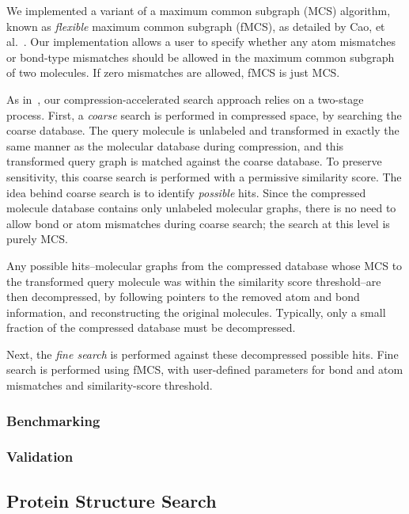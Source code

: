 \documentclass[review,preprint,12pt]{elsarticle}
\theoremstyle{definition}
\theoremstyle{remark}
\numberwithin{equation}{section}
\begin{document}
We implemented a variant of a maximum common subgraph (MCS) algorithm, known as \emph{flexible} maximum
common subgraph (fMCS), as detailed by Cao, et al.~\cite{cao}.
Our implementation allows a user to specify whether any atom mismatches or bond-type mismatches should be 
allowed in the maximum common subgraph of two molecules.
If zero mismatches are allowed, fMCS is just MCS.

As in~\cite{loh2012compressive}, our compression-accelerated search approach relies on a two-stage process.
First, a \emph{coarse} search is performed in compressed space, by searching the coarse database.
The query molecule is unlabeled and transformed in exactly the same manner as the molecular database
during compression, and this transformed query graph is matched against the coarse database.
To preserve sensitivity, this coarse search is performed with a permissive similarity score.
The idea behind coarse search is to identify \emph{possible} hits.
Since the compressed molecule database contains only unlabeled molecular graphs, there is no need to
allow bond or atom mismatches during coarse search; the search at this level is purely MCS.

Any possible hits--molecular graphs from the compressed database whose MCS to the transformed
query molecule was within the similarity score threshold--are then decompressed, by following
pointers to the removed atom and bond information, and reconstructing the original molecules.
Typically, only a small fraction of the compressed database must be decompressed.

Next, the \emph{fine search} is performed against these decompressed possible hits.
Fine search is performed using fMCS, with user-defined parameters for bond and atom mismatches and
similarity-score threshold.

\subsubsection*{Benchmarking}

\subsubsection*{Validation}

\subsection*{Protein Structure Search}
\end{document}
